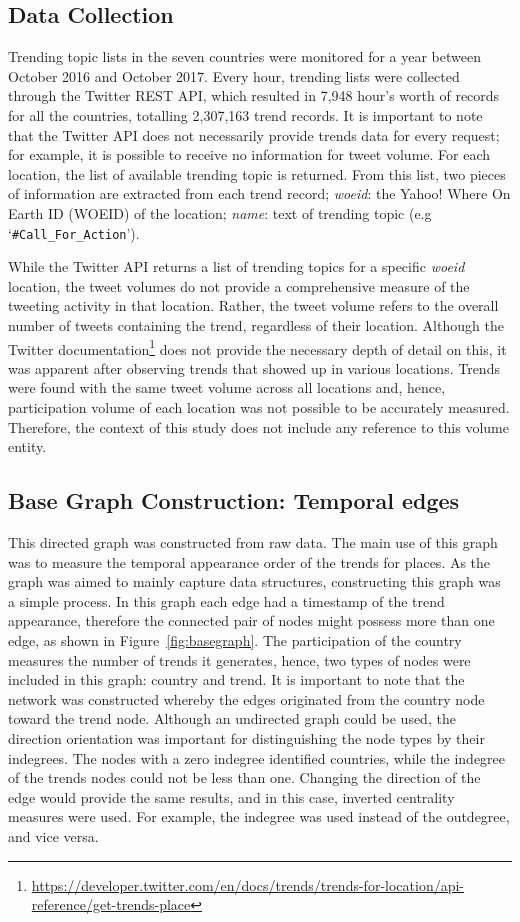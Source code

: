 \documentclass[conference]{IEEEtran}
\begin{document}
\subsection{Data Collection}

Trending topic lists in the seven countries were monitored for a year
between October 2016 and October 2017. Every hour, trending lists were
collected through the Twitter REST API, which resulted in 7,948 hour's
worth of records for all the countries, totalling 2,307,163 trend
records. It is important to note that the Twitter API does not
necessarily provide trends data for every request; for example, it is
possible to receive no information for tweet volume. For each
location, the list of available trending topic is returned. From this
list, two pieces of information are extracted from each trend record;
{\emph{woeid}}: the Yahoo! Where On Earth ID (WOEID) of the location;
{\emph{name}}: text of trending topic (e.g
`{\texttt{\#Call\_For\_Action}}').

While the Twitter API returns a list of trending topics for a specific
{\emph{woeid}} location, the tweet volumes do not provide a
comprehensive measure of the tweeting activity in that
location. Rather, the tweet volume refers to the overall number of
tweets containing the trend, regardless of their location. Although
the Twitter
documentation\footnote{\url{https://developer.twitter.com/en/docs/trends/trends-for-location/api-reference/get-trends-place}}
does not provide the necessary depth of detail on this, it was
apparent after observing trends that showed up in various
locations. Trends were found with the same tweet volume across all
locations and, hence, participation volume of each location was not
possible to be accurately measured. Therefore, the context of this
study does not include any reference to this volume entity.

\subsection{Base Graph Construction: Temporal edges}

This directed graph was constructed from raw data. The main use of
this graph was to measure the temporal appearance order of the trends
for places. As the graph was aimed to mainly capture data structures,
constructing this graph was a simple process.  In this graph each edge
had a timestamp of the trend appearance, therefore the connected pair
of nodes might possess more than one edge, as shown in
Figure~\ref{fig:basegraph}. The participation of the country measures
the number of trends it generates, hence, two types of nodes were
included in this graph: country and trend. It is important to note
that the network was constructed whereby the edges originated from the
country node toward the trend node. Although an undirected graph could
be used, the direction orientation was important for distinguishing
the node types by their indegrees. The nodes with a zero indegree
identified countries, while the indegree of the trends nodes could not
be less than one. Changing the direction of the edge would provide the
same results, and in this case, inverted centrality measures were
used. For example, the indegree was used instead of the outdegree, and
vice versa.
\end{document}
